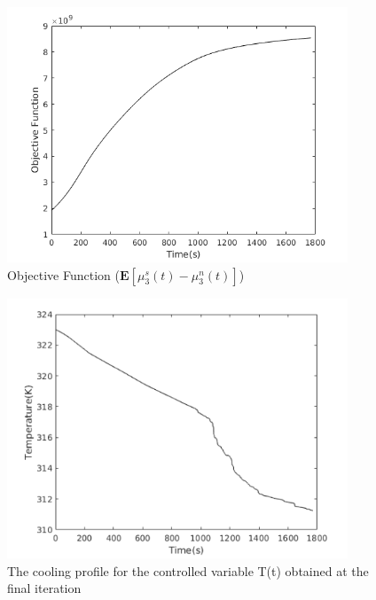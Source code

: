 \begin{figure}[h!] 

\begin{center}
\includegraphics[width=4in]{PCEobj.png}
\end{center}
\caption{Objective Function ($\mathbf{E}\left[\mu_{3}^{s}(t) - \mu_{3}^{n}(t)\right]$)}
\end{figure}
\begin{figure}[h!] 

\begin{center}
\includegraphics[width=4in]{PCETemp2.png}
\end{center}
\caption{The cooling profile for the controlled variable T(t) obtained at the final iteration}
\end{figure}

